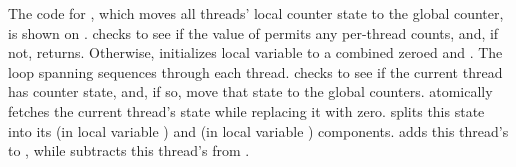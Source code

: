 \begin{fcvref}
The code for , which moves all threads' local
counter state to the global counter, is shown on
.
 checks to see if the value of
 permits
any per-thread counts, and, if not,  returns.
Otherwise,  initializes local variable  to a combined
zeroed  and .
The loop spanning  sequences
through each thread.
 checks to see if the current thread has counter state,
and, if so,  move that state
to the global counters.
 atomically fetches the current thread's state
while replacing it with zero.
 splits this state into its 
(in local variable )
and  (in local variable ) components.
 adds this thread's  to , while
 subtracts this thread's  from .
\end{fcvref}

